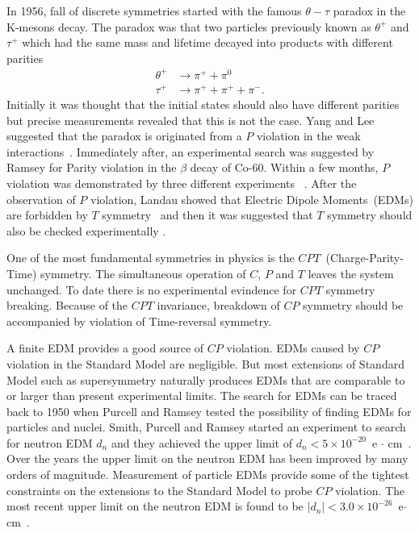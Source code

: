 In 1956, fall of discrete symmetries started with the famous
$\theta-\tau$ paradox in the K-mesons decay. The paradox was that two
particles previously known as $\theta^+$ and $\tau^+$ which had the
same mass and lifetime decayed into products with different parities
\begin{equation}
  \begin{split}
    \theta^+ &\rightarrow \pi^+ + \pi^0 \\
    \tau^+ &\rightarrow \pi^+ + \pi^+ + \pi^-.
  \end{split}
\end{equation}
Initially it was thought that the initial states should also have
different parities but precise measurements revealed that this is not
the case. Yang and Lee suggested that the paradox is originated from
a $P$ violation in the weak
interactions~\cite{lee1957parity}. Immediately after, an experimental
search was suggested by Ramsey for Parity violation in the $\beta$
decay of Co-60. Within a few months, $P$ violation was demonstrated by
three different experiments
~\cite{PhysRev.105.1413,PhysRev.105.1415,friedman1957nuclear}. After
the observation of $P$ violation, Landau showed that Electric Dipole
Moments~(EDMs) are forbidden by $T$
symmetry~\cite{landau1957conservation} and then it was suggested that
$T$ symmetry should also be checked experimentally
\cite{PhysRev.106.517}. 

One of the most fundamental symmetries in physics is the
$CPT$~(Charge-Parity-Time) symmetry. The simultaneous operation of
$C$, $P$ and $T$ leaves the system unchanged. To date there is no
experimental evindence for $CPT$ symmetry breaking.  Because of the
$CPT$ invariance, breakdown of $CP$ symmetry should be accompanied by
violation of Time-reversal symmetry. 

A finite EDM provides a good source of $CP$ violation. EDMs caused by
$CP$ violation in the Standard Model are negligible. But most
extensions of Standard Model such as supersymmetry naturally produces EDMs that
are comparable to or larger than present experimental limits.
The search for EDMs can be traced back to 1950 when Purcell and Ramsey
tested the possibility of finding EDMs for particles and
nuclei. Smith, Purcell and Ramsey started an experiment to search for
neutron EDM $d_n$ and they achieved the upper limit of
$d_n < 5 \times 10^{-20}$~e $\cdot$ cm~\cite{smith1957experimental}.
Over the years the upper limit on the neutron EDM has been improved by
many orders of magnitude. Measurement of particle EDMs provide some of
the tightest constraints on the extensions to the Standard Model to
probe $CP$ violation. The most recent upper limit on the neutron EDM
is found to be $\vert d_n\vert < 3.0 \times 10^{-26} $~e$\cdot$
cm~\cite{pendlebury2015revised}.



